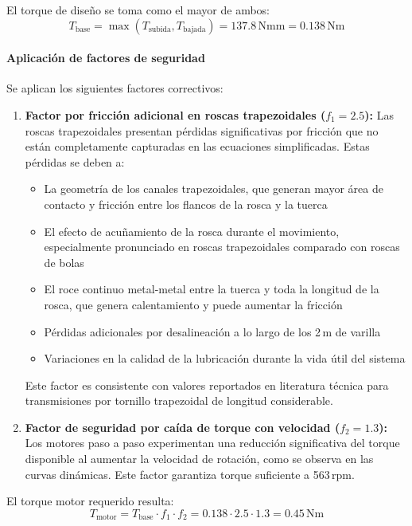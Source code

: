 El torque de diseño se toma como el mayor de ambos:
\[T_{\text{base}} = \max(T_{\text{subida}}, T_{\text{bajada}}) = 137.8\,\text{Nmm} = 0.138\,\text{Nm}\]

\paragraph{Aplicación de factores de seguridad}
Se aplican los siguientes factores correctivos:

\begin{enumerate}
    \item \textbf{Factor por fricción adicional en roscas trapezoidales ($f_1 = 2.5$):} Las roscas trapezoidales presentan pérdidas significativas por fricción que no están completamente capturadas en las ecuaciones simplificadas. Estas pérdidas se deben a:
    \begin{itemize}
        \item La geometría de los canales trapezoidales, que generan mayor área de contacto y fricción entre los flancos de la rosca y la tuerca
        \item El efecto de acuñamiento de la rosca durante el movimiento, especialmente pronunciado en roscas trapezoidales comparado con roscas de bolas
        \item El roce continuo metal-metal entre la tuerca y toda la longitud de la rosca, que genera calentamiento y puede aumentar la fricción
        \item Pérdidas adicionales por desalineación a lo largo de los 2\,m de varilla
        \item Variaciones en la calidad de la lubricación durante la vida útil del sistema
    \end{itemize}
    Este factor es consistente con valores reportados en literatura técnica para transmisiones por tornillo trapezoidal de longitud considerable.
    
    \item \textbf{Factor de seguridad por caída de torque con velocidad ($f_2 = 1.3$):} Los motores paso a paso experimentan una reducción significativa del torque disponible al aumentar la velocidad de rotación, como se observa en las curvas dinámicas. Este factor garantiza torque suficiente a 563\,rpm.
\end{enumerate}

El torque motor requerido resulta:
\begin{equation}
T_{\text{motor}} = T_{\text{base}} \cdot f_1 \cdot f_2 = 0.138 \cdot 2.5 \cdot 1.3 = 0.45\,\text{Nm}
\label{eq:torque_motor_vertical}
\end{equation}

